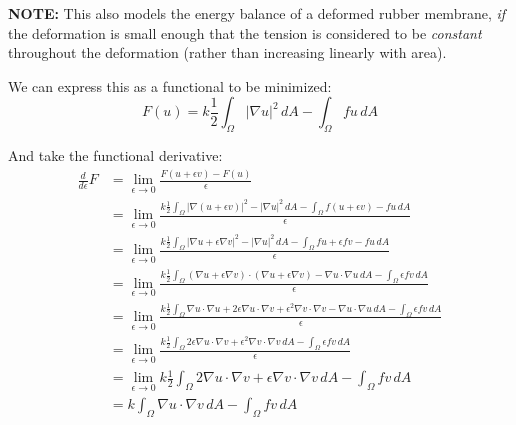 \documentclass[12pt, a4paper, twoside, openright]{book}
\begin{document}
\textbf{NOTE:}  This also models the energy balance of a deformed rubber membrane, \emph{if} the deformation is small enough that the tension is considered to be \emph{constant} throughout the deformation (rather than increasing linearly with area).

\vspace{2em}
We can express this as a functional to be minimized:
\begin{equation}
F(u) =  k \frac{1}{2} \int_{\Omega} |\nabla u|^2 \,dA - \int_{\Omega} f u \,dA
\end{equation}

And take the functional derivative:
\begin{align}
\frac{d}{d\epsilon}F & = \lim_{\epsilon \rightarrow 0}
                         \frac{F(u + \epsilon v) - F(u)}{\epsilon} \\
  & = \lim_{\epsilon \rightarrow 0}
    \frac{k \frac{1}{2} \int_{\Omega} |\nabla (u + \epsilon v)|^2 - |\nabla u|^2 \,dA
        - \int_{\Omega} f (u + \epsilon v) - f u \,dA}
         {\epsilon} \\
  & = \lim_{\epsilon \rightarrow 0}
    \frac{k \frac{1}{2} \int_{\Omega} |\nabla u + \epsilon \nabla v|^2 - |\nabla u|^2 \,dA
        - \int_{\Omega} f u + \epsilon f v - f u \,dA}
         {\epsilon} \\
  & = \lim_{\epsilon \rightarrow 0}
    \frac{k \frac{1}{2} \int_{\Omega} (\nabla u +  \epsilon \nabla v) \cdot 
    (\nabla u +  \epsilon \nabla v) - \nabla u \cdot \nabla u \,dA
        - \int_{\Omega} \epsilon f v \,dA}
         {\epsilon} \\       
  & = \lim_{\epsilon \rightarrow 0}
    \frac{k \frac{1}{2} \int_{\Omega} \nabla u \cdot \nabla u + 2 \epsilon \nabla u \cdot 
    \nabla v + \epsilon^2 \nabla v \cdot \nabla v - \nabla u \cdot \nabla u \,dA
        - \int_{\Omega} \epsilon f v \,dA}
         {\epsilon} \\                    
  & = \lim_{\epsilon \rightarrow 0}
    \frac{k \frac{1}{2} \int_{\Omega} 2 \epsilon \nabla u \cdot \nabla v
     + \epsilon^2 \nabla v \cdot \nabla v \,dA
        - \int_{\Omega} \epsilon f v \,dA}
         {\epsilon} \\
  & = \lim_{\epsilon \rightarrow 0}
    k \frac{1}{2} \int_{\Omega} 2 \nabla u \cdot \nabla v
     + \epsilon \nabla v \cdot \nabla v \,dA
        - \int_{\Omega} f v \,dA\\     
  & =
    k \int_{\Omega} \nabla u \cdot \nabla v \,dA
        - \int_{\Omega} f v \,dA
\end{align}
\end{document}
